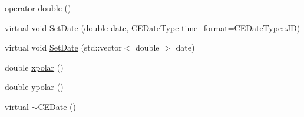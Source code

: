 \begin{DoxyCompactItemize}
\item 
\hyperlink{class_c_e_date_ae0654fdee3514c55117260bbf499839f}{operator double} ()
\item 
virtual void \hyperlink{class_c_e_date_acb27bd568466f1cd2f497df356c3ed70}{Set\+Date} (double date, \hyperlink{_c_e_date_8h_aa6b826beca26b0712061a4afc5ad7746}{C\+E\+Date\+Type} time\+\_\+format=\hyperlink{_c_e_date_8h_aa6b826beca26b0712061a4afc5ad7746aabf8d7515962e526421842e8456798cc}{C\+E\+Date\+Type\+::\+J\+D})
\item 
virtual void \hyperlink{class_c_e_date_a0afe9b5144dc4ed63ef78917f426855e}{Set\+Date} (std\+::vector$<$ double $>$ date)
\item 
double \hyperlink{class_c_e_date_a4a9004a8c1e7a5e64a5c567e09a7c521}{xpolar} ()
\item 
double \hyperlink{class_c_e_date_adef63e77a091d4bfdddff56b7aa06411}{ypolar} ()
\item 
virtual \hyperlink{class_c_e_date_a380991e2f2eaa8cbbb85d0da466e7c7b}{$\sim$\+C\+E\+Date} ()
\end{DoxyCompactItemize}
